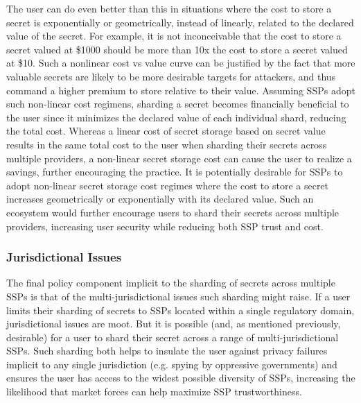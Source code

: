 The user can do even better than this in situations where the cost to
store a secret is exponentially or geometrically, instead of linearly,
related to the declared value of the secret. For example, it is not
inconceivable that the cost to store a secret valued at \$1000 should
be more than 10x the cost to store a secret valued at \$10. Such a
nonlinear cost vs value curve can be justified by the fact that more
valuable secrets are likely to be more desirable targets for
attackers, and thus command a higher premium to store relative to
their value. Assuming SSPs adopt such non-linear cost regimens,
sharding a secret becomes financially beneficial to the user since it
minimizes the declared value of each individual shard, reducing the
total cost. Whereas a linear cost of secret storage based on secret
value results in the same total cost to the user when sharding their
secrets across multiple providers, a non-linear secret storage cost
can cause the user to realize a savings, further encouraging the
practice. It is potentially desirable for SSPs to adopt non-linear
secret storage cost regimes where the cost to store a secret increases
geometrically or exponentially with its declared value. Such an
ecosystem would further encourage users to shard their secrets across
multiple providers, increasing user security while reducing both SSP
trust and cost.

\subsubsection{Jurisdictional Issues}
\label{chap:policy:trust:jurisdiction}

The final policy component implicit to the sharding of secrets across
multiple SSPs is that of the multi-jurisdictional issues such sharding
might raise. If a user limits their sharding of secrets to SSPs
located within a single regulatory domain, jurisdictional issues are
moot. But it is possible (and, as mentioned previously, desirable) for
a user to shard their secret across a range of multi-jurisdictional
SSPs. Such sharding both helps to insulate the user against privacy
failures implicit to any single jurisdiction (e.g. spying by
oppressive governments) and ensures the user has access to the widest
possible diversity of SSPs, increasing the likelihood that market
forces can help maximize SSP trustworthiness.

